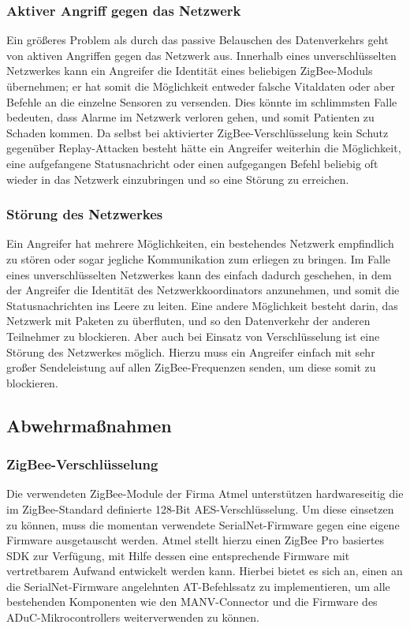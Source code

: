 \subsubsection{Aktiver Angriff gegen das Netzwerk}
Ein größeres Problem als durch das passive Belauschen des Datenverkehrs geht von aktiven Angriffen gegen das Netzwerk
aus. Innerhalb eines unverschlüsselten Netzwerkes kann ein Angreifer die Identität eines beliebigen ZigBee-Moduls 
übernehmen; er hat somit die Möglichkeit entweder falsche Vitaldaten oder aber Befehle an die einzelne Sensoren zu
versenden. Dies könnte im schlimmsten Falle bedeuten, dass Alarme im Netzwerk verloren gehen, und somit Patienten
zu Schaden kommen. Da selbst bei aktivierter ZigBee-Verschlüsselung kein Schutz gegenüber Replay-Attacken besteht hätte
ein Angreifer weiterhin die Möglichkeit, eine aufgefangene Statusnachricht oder einen aufgegangen Befehl beliebig oft
wieder in das Netzwerk einzubringen und so eine Störung zu erreichen.

\subsubsection{Störung des Netzwerkes}
Ein Angreifer hat mehrere Möglichkeiten, ein bestehendes Netzwerk empfindlich zu stören oder sogar jegliche Kommunikation
zum erliegen zu bringen. Im Falle eines unverschlüsselten Netzwerkes kann des einfach dadurch geschehen, in dem
der Angreifer die Identität des Netzwerkkoordinators anzunehmen, und somit die Statusnachrichten ins Leere zu leiten. Eine
andere Möglichkeit besteht darin, das Netzwerk mit Paketen zu überfluten, und so den Datenverkehr der anderen Teilnehmer
zu blockieren. Aber auch bei Einsatz von Verschlüsselung ist eine Störung des Netzwerkes möglich. Hierzu muss ein Angreifer
einfach mit sehr großer Sendeleistung auf allen ZigBee-Frequenzen senden, um diese somit zu blockieren. 

\subsection{Abwehrmaßnahmen}

\subsubsection{ZigBee-Verschlüsselung}
Die verwendeten ZigBee-Module der Firma Atmel unterstützen hardwareseitig die im ZigBee-Standard definierte 128-Bit 
AES-Verschlüsselung. Um diese einsetzen zu können, muss die momentan verwendete SerialNet-Firmware gegen eine eigene
Firmware ausgetauscht werden. Atmel stellt hierzu einen ZigBee Pro basiertes SDK zur Verfügung, mit Hilfe dessen
eine entsprechende Firmware mit vertretbarem Aufwand entwickelt werden kann. Hierbei bietet es sich an, einen an die
SerialNet-Firmware angelehnten AT-Befehlssatz zu implementieren, um alle bestehenden Komponenten wie den MANV-Connector
und die Firmware des ADuC-Mikrocontrollers weiterverwenden zu können.

